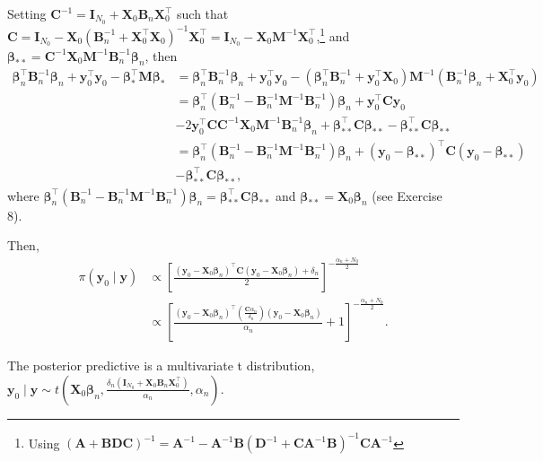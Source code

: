 Setting ${\bm{C}}^{-1}={\bm{I}}_{N_0}+{\bm{X}}_0{\bm{B}}_n{\bm{X}}_0^{\top}$ such that ${\bm{C}}={\bm{I}}_{N_0}-{\bm{X}}_0({\bm{B}}_n^{-1}+{\bm{X}}_0^{\top}{\bm{X}}_0)^{-1}{\bm{X}}_0^{\top}={\bm{I}}_{N_0}-{\bm{X}}_0{\bm{M}}^{-1}{\bm{X}}_0^{\top}$,\footnote{Using $({\bm{A}}+{\bm{B}}{\bm{D}}{\bm{C}})^{-1}={\bm{A}}^{-1}-{\bm{A}}^{-1}{\bm{B}}({\bm{D}}^{-1}+{\bm{C}}{\bm{A}}^{-1}{\bm{B}})^{-1}{\bm{C}}{\bm{A}}^{-1}$} and ${\bm{\bm{\beta}}}_{**}={\bm{C}}^{-1}{\bm{X}}_0{\bm{M}}^{-1}{\bm{B}}_n^{-1}\bm{\beta}_n$, then 
{\footnotesize{
\begin{align*}
	\bm{\beta}_n^{\top}{\bm{B}}_n^{-1}\bm{\beta}_n+{\bm{y}}_0^{\top}{\bm{y}}_0-\bm{\beta}_*^{\top}{\bm{M}}\bm{\beta}_*&=
	\bm{\beta}_n^{\top}{\bm{B}}_n^{-1}\bm{\beta}_n+{\bm{y}}_0^{\top}{\bm{y}}_0-(\bm{\beta}_n^{\top}{\bm{B}}_n^{-1}+{\bm{y}}_0^{\top}{\bm{X}}_0){\bm{M}}^{-1}({\bm{B}}_n^{-1}\bm{\beta}_n+{\bm{X}}_0^{\top}{\bm{y}}_0)\\
	&=\bm{\beta}_n^{\top}({\bm{B}}_n^{-1}-{\bm{B}}_n^{-1}{\bm{M}}^{-1}{\bm{B}}_n^{-1})\bm{\beta}_n+{\bm{y}}_0^{\top}{\bm{C}}{\bm{y}}_0\\
	&-2{\bm{y}}_0^{\top}{\bm{C}}{\bm{C}}^{-1}{\bm{X}}_0{\bm{M}}^{-1}{\bm{B}}_n^{-1}\bm{\beta}_n+{\bm{\bm{\beta}}}_{**}^{\top}{\bm{C}}{\bm{\bm{\beta}}}_{**}-{\bm{\bm{\beta}}}_{**}^{\top}{\bm{C}}{\bm{\bm{\beta}}}_{**}\\
	&=\bm{\beta}_n^{\top}({\bm{B}}_n^{-1}-{\bm{B}}_n^{-1}{\bm{M}}^{-1}{\bm{B}}_n^{-1})\bm{\beta}_n+({\bm{y}}_0-{\bm{\bm{\beta}}}_{**})^{\top}{\bm{C}}({\bm{y}}_0-{\bm{\bm{\beta}}}_{**})\\
	&-{\bm{\bm{\beta}}}_{**}^{\top}{\bm{C}}{\bm{\bm{\beta}}}_{**},
\end{align*}
}}
where $\bm{\beta}_n^{\top}({\bm{B}}_n^{-1}-{\bm{B}}_n^{-1}{\bm{M}}^{-1}{\bm{B}}_n^{-1})\bm{\beta}_n={\bm{\bm{\beta}}}_{**}^{\top}{\bm{C}}{\bm{\bm{\beta}}}_{**}$ and $\bm{\beta}_{**}={\bm{X}}_0\bm{\beta}_n$ (see Exercise 8).

Then,
\begin{align*}
	\pi({\bm{y}}_0\mid {\bm{y}})&\propto\left[\frac{({\bm{y}}_0-{\bm{X}}_0\bm{\beta}_n)^{\top}{\bm{C}}({\bm{y}}_0-{\bm{X}}_0\bm{\beta}_n)+\delta_n}{2}\right]^{-\frac{\alpha_n+N_0}{2}}\\
	&\propto\left[\frac{({\bm{y}}_0-{\bm{X}}_0\bm{\beta}_n)^{\top}\left(\frac{{\bm{C}}\alpha_n}{\delta_n}\right)({\bm{y}}_0-{\bm{X}}_0\bm{\beta}_n)}{\alpha_n}+1\right]^{-\frac{\alpha_n+N_0}{2}}.
\end{align*}

The posterior predictive is a multivariate t distribution, ${\bm{y}}_0\mid {\bm{y}}\sim t\left({\bm{X}}_0\bm{\beta}_n,\frac{\delta_n({\bm{I}}_{N_0}+{\bm{X}}_0{\bm{B}}_n{\bm{X}}_0^{\top})}{\alpha_n},\alpha_n\right)$.\\


